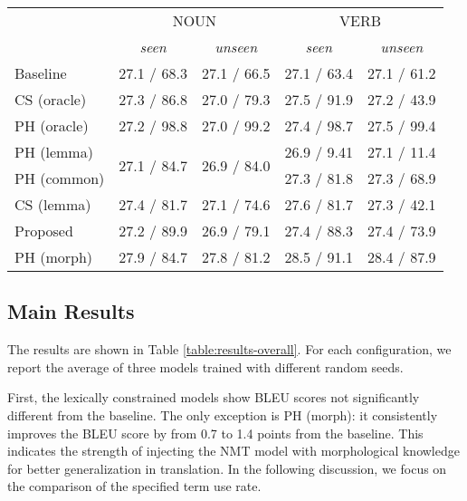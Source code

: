 \begin{table*}[h]
  \centering
  \begin{tabular}{lllll} \toprule
      & \multicolumn{2}{c}{NOUN}                              & \multicolumn{2}{c}{VERB}                              \\
      & \multicolumn{1}{c}{{\it seen}} & \multicolumn{1}{c}{{\it unseen}} & \multicolumn{1}{c}{{\it seen}} & \multicolumn{1}{c}{{\it unseen}} \\ \midrule
      Baseline & 27.1 / 68.3 & 27.1 / 66.5 & 27.1 / 63.4 & 27.1 / 61.2 \\ \midrule
      CS (oracle) & 27.3 / 86.8 & 27.0 / 79.3 & 27.5 / 91.9 & 27.2 / 43.9 \\
      PH (oracle) & 27.2 / 98.8 & 27.0 / 99.2 & 27.4 / 98.7 & 27.5 / 99.4 \\ \midrule
      PH (lemma) & \multirow{2}{*}{27.1 / 84.7}  & \multirow{2}{*}{26.9 / 84.0} & 26.9 / 9.41 & 27.1 / 11.4 \\
      PH (common) &                            &  & 27.3 / 81.8 & 27.3 / 68.9 \\
      CS (lemma) & 27.4 / 81.7 & 27.1 / 74.6 & 27.6 / 81.7 & 27.3 / 42.1 \\
      Proposed & 27.2 / 89.9 & 26.9 / 79.1 & 27.4 / 88.3 & 27.4 / 73.9 \\
      PH (morph) & 27.9 / 84.7 & 27.8 / 81.2 & 28.5 / 91.1 & 28.4 / 87.9 \\
  \bottomrule
  \end{tabular}
\caption{BLUE scores and the specified term use rate of the different models over different evaluation dictionaries. CS: Code-switching, PH: placeholder. For NOUN, PH (lemma) and PH (common) are the same model because the most common inflection for nouns is their lemma.}
\label{table:results-overall}
\end{table*}



\subsection{Main Results}
The results are shown in Table \ref{table:results-overall}. For each configuration, we report the average of three models trained with different random seeds.

First, the lexically constrained models show BLEU scores not significantly different from the baseline.
The only exception is PH (morph): it consistently improves the BLEU score by from 0.7 to 1.4 points from the baseline.
This indicates the strength of injecting the NMT model with morphological knowledge for better generalization in translation.
In the following discussion, we focus on the comparison of the specified term use rate.

